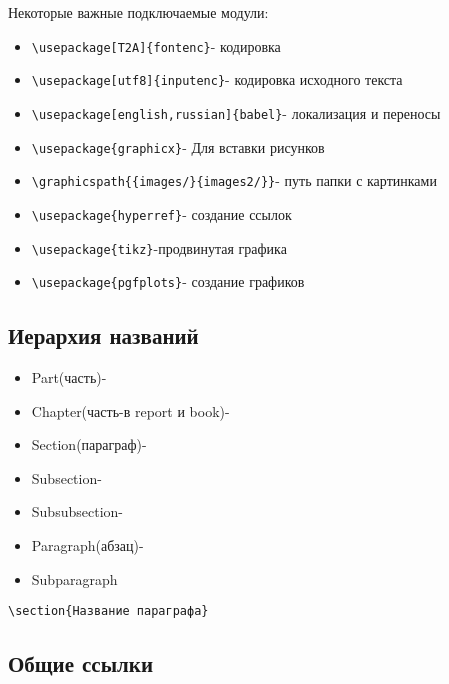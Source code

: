 \documentclass[a4paper,12pt]{article}%
\theoremstyle{plain}%
\theoremstyle{definition}%
\theoremstyle{remark}%
\begin{document}
\noindent Некоторые важные подключаемые модули:
\begin{itemize}
\item \verb|\usepackage[T2A]{fontenc}|- кодировка
\item \verb|\usepackage[utf8]{inputenc}|- кодировка исходного текста
\item \verb|\usepackage[english,russian]{babel}|- локализация и переносы
\item \verb|\usepackage{graphicx}|- Для вставки рисунков
\item \verb|\graphicspath{{images/}{images2/}}|- путь папки с картинками
\item \verb|\usepackage{hyperref}|- создание ссылок
\item \verb|\usepackage{tikz}|-продвинутая графика
\item \verb|\usepackage{pgfplots}|- создание графиков
\end{itemize}



\subsection{Иерархия названий}

\begin{itemize}
\item[] Part(часть)-
\item[] Chapter(часть-в report и book)-
\item[] Section(параграф)-
\item[] Subsection-
\item[] Subsubsection-
\item[] Paragraph(абзац)-
\item[] Subparagraph
\end{itemize}

\noindent\verb|\section{Название параграфа}|



\subsection{Общие ссылки}
\end{document}
